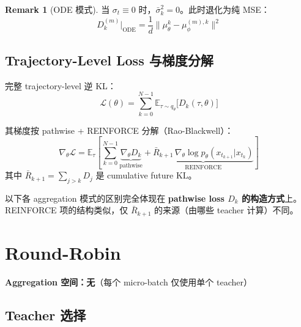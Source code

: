 \documentclass[11pt,a4paper]{article}
\newcommand{\loss}{\mathcal{L}}
\newcommand{\E}{\mathbb{E}}
\newcommand{\mutheta}{\mu_\theta}
\newcommand{\muphi}{\mu_\phi}
\newcommand{\sigbar}{\bar{\sigma}}
\newcommand{\Rbar}{\bar{R}}
\theoremstyle{definition}
\newtheorem{remark}{Remark}
\begin{document}
\begin{remark}[ODE 模式]
当 $\sigma_t \equiv 0$ 时，$\sigbar_k^2 = 0$。此时退化为纯 MSE：
\begin{equation}
D_k^{(m)}\big|_{\mathrm{ODE}} = \frac{1}{d}\|\mutheta^k - \muphi^{(m),k}\|^2
\end{equation}
\end{remark}

\subsection{Trajectory-Level Loss 与梯度分解}

完整 trajectory-level 逆 KL：
\begin{equation}
\loss(\theta) = \sum_{k=0}^{N-1} \E_{\tau \sim q_\theta}\!\bigl[D_k(\tau,\theta)\bigr]
\label{eq:trajectory_loss}
\end{equation}

其梯度按 pathwise + REINFORCE 分解（Rao-Blackwell）：
\begin{equation}
\nabla_\theta \loss = \E_\tau\!\left[\sum_{k=0}^{N-1} \underbrace{\nabla_\theta D_k}_{\text{pathwise}}
+ \underbrace{\Rbar_{k+1}\,\nabla_\theta \log p_\theta(x_{t_{k+1}}|x_{t_k})}_{\text{REINFORCE}}\right]
\label{eq:grad_decomp}
\end{equation}
其中 $\Rbar_{k+1} = \sum_{j>k} D_j$ 是 cumulative future KL。

\medskip
\begin{tcolorbox}[colback=blue!5, colframe=blue!40, title=本文重点]
以下各 aggregation 模式的区别完全体现在 \textbf{pathwise loss $D_k$ 的构造方式}上。REINFORCE 项的结构类似，仅 $\Rbar_{k+1}$ 的来源（由哪些 teacher 计算）不同。
\end{tcolorbox}

\section{Round-Robin}
\label{sec:round_robin}

\begin{tcolorbox}[colback=gray!5, colframe=gray!50]
\textbf{Aggregation 空间：无}（每个 micro-batch 仅使用单个 teacher）
\end{tcolorbox}

\subsection{Teacher 选择}
\end{document}

